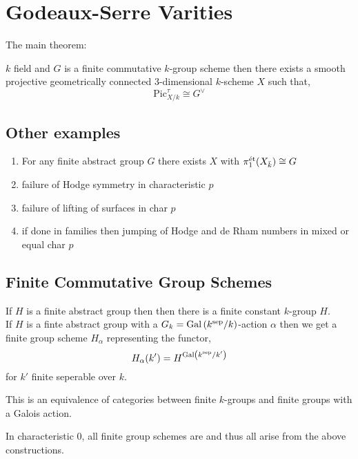 \documentclass[12pt]{article}
\begin{document}
\newcommand{\fPic}{\mathrm{Pic}}

\section{Godeaux-Serre Varities}

The main theorem:

\begin{thm}
$k$ field and $G$ is a finite commutative $k$-group scheme then there exists a smooth projective geometrically connected $3$-dimensional $k$-scheme $X$ such that,
\[ \mathrm{Pic}^{\tau}_{X/k} \cong G^\vee \]
\end{thm}

\subsection{Other examples}

\begin{enumerate}
\item For any finite abstract group $G$ there exists $X$ with $\pi_1^{\text{\'{e}t}}(X_{\bar{k}}) \cong G$ 
\item failure of Hodge symmetry in characteristic $p$
\item failure of lifting of surfaces in char $p$
\item if done in families then jumping of Hodge and de Rham numbers in mixed or equal char $p$
\end{enumerate}

\subsection{Finite Commutative Group Schemes}

If $H$ is a finite abstract group then then there is a finite constant $k$-group $H$. 
\bigskip\\
If $H$ is a finte abstract group with a $G_k = \mathrm{Gal}\left( k^{\mathrm{sep}}/k \right)$-action $\alpha$ then we get a finite \etale group scheme $H_\alpha$ representing the functor,
\[ H_\alpha(k') = H^{\mathrm{Gal}\left( k^{\mathrm{sep}} / k' \right)} \]
for $k'$ finite seperable over $k$. 

\begin{prop}
This is an equivalence of categories between finite \etale $k$-groups and finite groups with a Galois action.
\end{prop}

\begin{rmk}
In characteristic $0$, all finite group schemes are \etale and thus all arise from the above constructions. 
\end{rmk}
\end{document}
